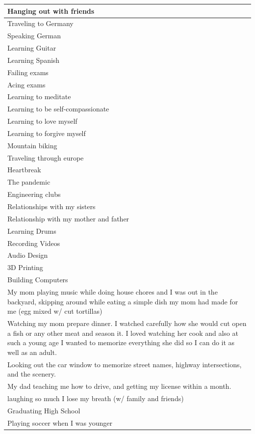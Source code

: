 \documentclass[
  .7em,
  letterpaper,
  DIV=11,
  numbers=noendperiod]{scrartcl}
\begin{document}
\begin{table}
\begin{tabular}{l}
\hline
Hanging out with friends\\
\hline
Traveling to Germany\\
\hline
Speaking German\\
\hline
Learning Guitar\\
\hline
Learning Spanish\\
\hline
Failing exams\\
\hline
Acing exams\\
\hline
Learning to meditate\\
\hline
Learning to be self-compassionate\\
\hline
Learning to love myself\\
\hline
Learning to forgive myself\\
\hline
Mountain biking\\
\hline
Traveling through europe\\
\hline
Heartbreak\\
\hline
The pandemic\\
\hline
Engineering clubs\\
\hline
Relationships with my sisters\\
\hline
Relationship with my mother and father\\
\hline
Learning Drums\\
\hline
Recording Videos\\
\hline
Audio Design\\
\hline
3D Printing\\
\hline
Building Computers\\
\hline
My mom playing music while doing house chores and I was out in the backyard, skipping around while eating a simple dish my mom had made for me (egg mixed w/ cut tortillas)\\
\hline
Watching my mom prepare dinner. I watched carefully how she would cut open a fish or any other meat and season it. I loved watching her cook and also at such a young age I wanted to memorize everything she did so I can do it as well as an adult.\\
\hline
Looking out the car window to memorize street names, highway intersections, and the scenery.\\
\hline
My dad teaching me how to drive, and getting my license within a month.\\
\hline
laughing so much I lose my breath (w/ family and friends)\\
\hline
Graduating High School\\
\hline
Playing soccer when I was younger\\

\end{tabular}
\end{table}
\end{document}
